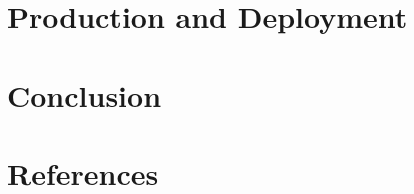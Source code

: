 \section[Deploy]{Production and Deployment}



\section[End]{Conclusion}



\section[Refs]{References}


